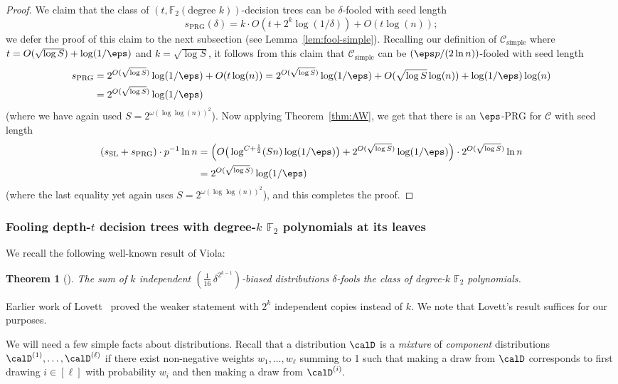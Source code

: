 \documentclass[11pt]{article}
\numberwithin{equation}{section}
\newtheorem{theorem}{Theorem}[section]
\theoremstyle{definition}
\theoremstyle{plain}
\theoremstyle{plain}
\newcommand{\simple}{\mathrm{simple}}
\newcommand{\PRG}{\mathrm{PRG}}
\newcommand{\SL}{\mathrm{SL}}
\renewcommand{\F}{\mathds{F}}
\begin{document}
\begin{proof}
 
We claim that the class of $(t,\F_2(\text{degree $k$}))$-decision trees can be $\delta$-fooled with seed length 
\[ s_\PRG(\delta) =  k \cdot O(t + 2^k\log(1/\delta)) + O(t \log(n)); \]
we defer the proof of this claim to the next subsection (see Lemma~\ref{lem:fool-simple}).   Recalling our definition of $\mathscr{C}_\simple$ where $t = O(\sqrt{\log S}) + \log(1/\eps)$ and $k = \sqrt{\log S}$, it follows from this claim that $\mathscr{C}_\simple$ can be $(\eps p/(2\ln n))$-fooled with seed length 
\begin{align*}s_\PRG &= 2^{O(\sqrt{\log S})} \log(1/\eps)
+ O(t \log(n)) = 2^{O(\sqrt{\log S})} \log(1/\eps) + O(\sqrt{\log S} \log(n)) + \log(1/\eps) \log(n)\\
&=2^{O(\sqrt{\log S})} \log(1/\eps)
\end{align*}
(where we have again used $S = 2^{\omega(\log \log(n))^2}$).
Now applying Theorem~\ref{thm:AW}, we get that there is an $\eps$-PRG for $\mathscr{C}$ with seed length 
\begin{align*}
(s_\SL + s_\PRG) \cdot p^{-1}\ln n &= \Big(O\big( \log^{C+\frac1{2}}(Sn) \log(1/\eps)\big) + 2^{O(\sqrt{\log S})}\log(1/\eps)\Big) \cdot 2^{O(\sqrt{\log S})} \ln n \\
&= 2^{O(\sqrt{\log S})} \log(1/\eps)
\end{align*} 
(where the last equality yet again uses $S = 2^{\omega(\log \log(n))^2}$),
and this completes the proof. 
 \end{proof} 







\subsubsection{Fooling depth-$t$ decision trees with degree-$k$ $\F_2$ polynomials at its leaves} 

We recall the following well-known result of Viola:
\begin{theorem}[\cite{Vio09}] 
\label{thm:viola}
The sum of $k$ independent $(\frac1{16}\, \delta^{2^{k-1}})$-biased distributions $\delta$-fools the class of degree-$k$ $\F_2$ polynomials. 
\end{theorem}

Earlier work of Lovett~\cite{Lov09} proved the weaker statement with $2^k$ independent copies instead of $k$. We note that Lovett's result suffices for our purposes. 

We will need a few simple facts about distributions. Recall that a distribution $\calD$ is a \emph{mixture} of
\emph{component} distributions $\calD^{(1)},\dots,\calD^{(\ell)}$ if there exist non-negative weights $w_1,\dots,w_\ell$ summing to 1 such that making a draw
from $\calD$ corresponds to first drawing $i \in [\ell]$ with probability $w_i$ and then making a draw from $\calD^{(i)}.$
\end{document}
